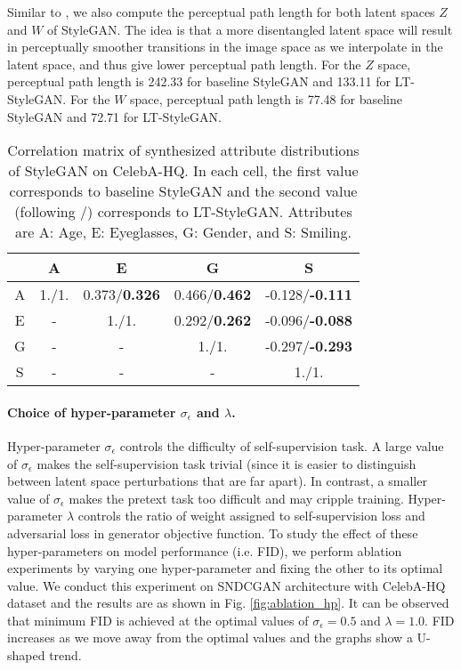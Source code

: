 \documentclass[10pt,twocolumn,letterpaper]{article}
\begin{document}
Similar to \cite{stylegan2019karras}, we also compute the perceptual path length for both latent spaces $Z$ and $W$ of StyleGAN. The idea is that a more disentangled latent space will result in perceptually smoother transitions in the image space as we interpolate in the latent space, and thus give lower perceptual path length. For the $Z$ space, perceptual path length is 242.33 for baseline StyleGAN and 133.11 for LT-StyleGAN. For the $W$ space, perceptual path length is 77.48 for baseline StyleGAN and 72.71 for LT-StyleGAN.

\begin{table}[t]
\begin{tabular}{|c|c|c|c|c|}
\hline
           & A     & E  & G      & S       \\ \hline
A        & 1./1. & 0.373/\textbf{0.326} & 0.466/\textbf{0.462} & -0.128/\textbf{-0.111} \\ \hline
E & -       & 1./1.     & 0.292/\textbf{0.262} & -0.096/\textbf{-0.088} \\ \hline
G     & -       & -           & 1./1.     & -0.297/\textbf{-0.293} \\ \hline
S    & -       & -           & -           & 1./1.       \\ \hline
\end{tabular}
\caption{\footnotesize{Correlation matrix of synthesized attribute distributions of StyleGAN on CelebA-HQ. In each cell, the first value corresponds to baseline StyleGAN and the second value (following /) corresponds to LT-StyleGAN. Attributes are A: Age, E: Eyeglasses, G: Gender, and S: Smiling.}}
\label{tab:correlation-syn-attr-dis-stylegan}
\end{table}
\vspace{-8pt}
\paragraph{Choice of hyper-parameter $\sigma_{\epsilon}$ and $\lambda$.} 
Hyper-parameter $\sigma_{\epsilon}$ controls the difficulty of self-supervision task. A large value of $\sigma_\epsilon$ makes the self-supervision task trivial (since it is easier to distinguish between latent space perturbations that are far apart). In contrast, a smaller value of $\sigma_\epsilon$ makes the pretext task too difficult and may cripple training. Hyper-parameter $\lambda$ controls the ratio of weight assigned to self-supervision loss and adversarial loss in generator objective function. To study the effect of these hyper-parameters on model performance (i.e. FID), we perform ablation experiments by varying one hyper-parameter and fixing the other to its optimal value. We conduct this experiment on SNDCGAN architecture with CelebA-HQ dataset and the results are as shown in Fig. \ref{fig:ablation_hp}. It can be observed that minimum FID is achieved at the optimal values of $\sigma_\epsilon=0.5$ and $\lambda=1.0$. FID increases as we move away from the optimal values and the graphs show a U-shaped trend.
\end{document}
